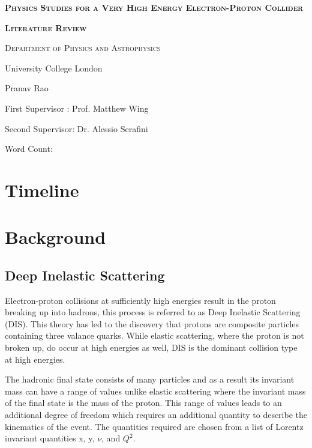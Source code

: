 \documentclass[journal, a4paper,12pt]{IEEEtran}
\begin{document}
\begin{titlepage}
	\centering
    \vspace{2cm}
    {\scshape\LARGE\bfseries Physics Studies for a Very High Energy Electron-Proton Collider\par}
	{\scshape\Large\bfseries Literature Review\par}
	\vspace{2cm}
	{\scshape\Large Department of Physics and Astrophysics\par University College London\par}
	\vspace{2cm}
	{\huge\bfseries\par}
	{\large Pranav Rao\par}
	{\large First Supervisor : Prof. Matthew Wing\par Second Supervisor: Dr. Alessio Serafini\par}
	\vspace{10cm}
	Word Count: 

	\vfill
\end{titlepage}

    
\justify
\section{Timeline}

\section{Background}

\subsection{Deep Inelastic Scattering}

Electron-proton collisions at sufficiently high energies result in the proton breaking up into hadrons, this process is referred to as Deep Inelastic Scattering (DIS). This theory has led to the discovery that protons are composite particles containing three valance quarks. While elastic scattering, where the proton is not broken up, do occur at high energies as well, DIS is the dominant collision type at high energies.

The hadronic final state consists of many particles and as a result its invariant mass can have a range of values unlike elastic scattering where the invariant mass of the final state is the mass of the proton. This range of values leads to an additional degree of freedom which requires an additional quantity to describe the kinematics of the event. The quantities required are chosen from a list of Lorentz invariant quantities x, y, $\nu$, and $Q^2$. 
\end{document}
